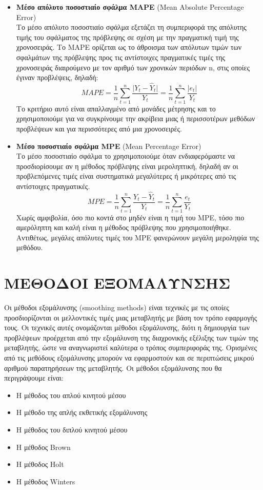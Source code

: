 \begin{itemize}
\item \textbf{Μέσο απόλυτο ποσοστιαίο σφάλμα MAPE} (Mean Absolute Percentage
Error)\\
Το μέσο απόλυτο ποσοστιαίο σφάλμα εξετάζει τη συμπεριφορά της απόλυτης
τιμής του σφάλματος της πρόβλεψης σε σχέση με την πραγματική τιμή της
χρονοσειράς. Το MAPE ορίζεται ως το άθροισμα των απόλυτων τιμών των
σφαλμάτων της πρόβλεψης προς τις αντίστοιχες πραγματικές τιμές της χρονοσειράς
διαιρούμενο με τον αριθμό των χρονικών περιόδων n, στις οποίες έγιναν προβλέψεις,
δηλαδή:\\
$$MAPE= \frac{1}{n} \sum_{t=1}^n \frac{\vert Y_t-\widehat{Y}_t \vert}{Y_t}=\frac{1}{n}\sum_{t=1}^n \frac{\vert e_t \vert}{Y_t} $$
Το κριτήριο αυτό είναι απαλλαγμένο από μονάδες μέτρησης και το
χρησιμοποιούμε για να συγκρίνουμε την ακρίβεια μιας ή περισσοτέρων μεθόδων
προβλέψεων και για περισσότερες από μια χρονοσειρές.

\item \textbf{Μέσο ποσοστιαίο σφάλμα MPE} (Mean Percentage Error)\\
Το μέσο ποσοστιαίο σφάλμα το χρησιμοποιούμε όταν ενδιαφερόμαστε να
προσδιορίσουμε αν η μέθοδος πρόβλεψης είναι μεροληπτική, δηλαδή αν οι
προβλεπόμενες τιμές είναι συστηματικά μεγαλύτερες ή μικρότερες από τις
αντίστοιχες πραγματικές.\\
$$ MPE= \frac{1}{n} \sum_{t=1}^n \frac{Y_t-\widehat{Y}_t}{Y_t} =\frac{1}{n} \sum_{t=1}^n \frac{e_t}{Y_t}$$
Χωρίς αμφιβολία, όσο πιο κοντά στο μηδέν είναι η τιμή του MPE, τόσο πιο
αμερόληπτη και καλή είναι η μέθοδος πρόβλεψης που χρησιμοποιήθηκε. Αντιθέτως,
μεγάλες απόλυτες τιμές του MPE φανερώνουν μεγάλη μεροληψία της μεθόδου.


\end{itemize}


\section{ΜΕΘΟΔΟΙ ΕΞΟΜΑΛΥΝΣΗΣ}

Οι μέθοδοι εξομάλυνσης (smoothing methods) είναι τεχνικές με τις οποίες
προσδιορίζονται οι μελλοντικές τιμές μιας μεταβλητής με βάση τον τρόπο εφαρμογής
τους. Οι τεχνικές αυτές ονομάζονται μέθοδοι εξομάλυνσης, διότι η δημιουργία των
προβλέψεων προέρχεται από την εξομάλυνση της διαχρονικής εξέλιξης των τιμών της
μεταβλητής, ώστε να αναγνωριστεί καλύτερα ο τρόπος συμπεριφοράς της. Ορισμένες
από τις μεθόδους εξομάλυνσης μπορούν να εφαρμοστούν και σε περιπτώσεις μικρού
αριθμού παρατηρήσεων της μεταβλητής. Οι μέθοδοι εξομάλυνσης που θα
περιγράψουμε είναι:\\
\begin{itemize}
\item Η μέθοδος του απλού κινητού μέσου
\item Η μέθοδο της απλής εκθετικής εξομάλυνσης
\item Η μέθοδος του διπλού κινητού μέσου
\item Η μέθοδος Brown
\item Η μέθοδος Holt
\item Η μέθοδος Winters
\end{itemize}

